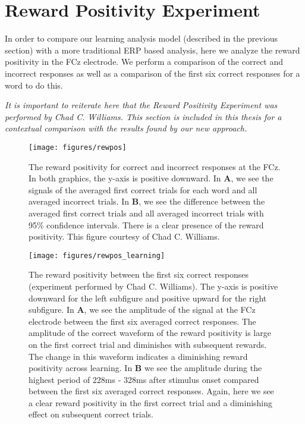 \section{Reward Positivity Experiment}

In order to compare our learning analysis model (described in the previous 
section) with a more traditional ERP based analysis, here we analyze the reward 
positivity in the FCz electrode. We perform a comparison of the correct and 
incorrect responses as well as a comparison of the first six correct responses 
for a word to do this.

\emph{It is important to reiterate here that the Reward Positivity Experiment 
was performed by Chad C. Williams. This section is included in this thesis for 
a contextual comparison with the results found by our new approach.}

\begin{figure}[p]
  \centerline{
    \texttt{[image: figures/rewpos]}
  }
  \caption[Reward Positivity for Correct and Incorrect Responses]{
    The reward positivity for correct and incorrect responses at the FCz. In 
    both graphics, the y-axis is positive downward. In {\bf A}, we see the 
    signals of the averaged first correct trials for each word and all averaged 
    incorrect trials. In {\bf B}, we see the difference between the averaged 
    first correct trials and all averaged incorrect trials with 95\% confidence 
    intervals. There is a clear presence of the reward positivity. This figure 
    courtesy of Chad C. Williams.
  }
  \label{fig:rewpos}
\end{figure}

\begin{figure}[p]
  \centerline{
    \texttt{[image: figures/rewpos\_learning]}
  }
  \caption[Reward Positivity between the First Six Correct Responses]{
    The reward positivity between the first six correct responses (experiment 
    performed by Chad C. Williams). The y-axis is positive downward for the 
    left subfigure and positive upward for the right subfigure. In {\bf A}, we 
    see the amplitude of the signal at the FCz electrode between the first six 
    averaged correct responses. The amplitude of the correct waveform of the 
    reward positivity is large on the first correct trial and diminishes with 
    subsequent rewards.  The change in this waveform indicates a diminishing 
    reward positivity across learning. In {\bf B} we see the amplitude during 
    the highest period of 228ms - 328ms after stimulus onset compared between 
    the first six averaged correct responses.  Again, here we see a clear 
    reward positivity in the first correct trial and a diminishing effect on 
    subsequent correct trials.
  }
  \label{fig:rewpos_learning}
\end{figure}

